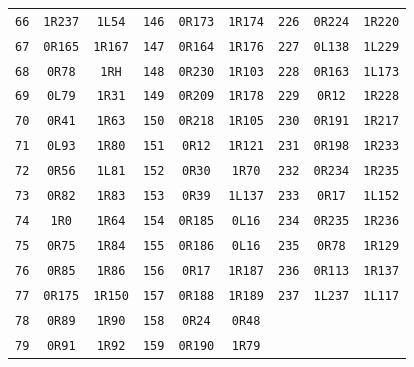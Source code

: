\begin{longtable}{@{}rcc@{\hspace{1.6em}}rcc@{\hspace{1.6em}}rcc@{}}
\texttt{66} & \texttt{1R237} & \texttt{1L54} & \texttt{146} & \texttt{0R173} & \texttt{1R174} & \texttt{226} & \texttt{0R224} & \texttt{1R220}\\
\texttt{67} & \texttt{0R165} & \texttt{1R167} & \texttt{147} & \texttt{0R164} & \texttt{1R176} & \texttt{227} & \texttt{0L138} & \texttt{1L229}\\
\texttt{68} & \texttt{0R78} & \texttt{1RH} & \texttt{148} & \texttt{0R230} & \texttt{1R103} & \texttt{228} & \texttt{0R163} & \texttt{1L173}\\
\texttt{69} & \texttt{0L79} & \texttt{1R31} & \texttt{149} & \texttt{0R209} & \texttt{1R178} & \texttt{229} & \texttt{0R12} & \texttt{1R228}\\
\texttt{70} & \texttt{0R41} & \texttt{1R63} & \texttt{150} & \texttt{0R218} & \texttt{1R105} & \texttt{230} & \texttt{0R191} & \texttt{1R217}\\
\texttt{71} & \texttt{0L93} & \texttt{1R80} & \texttt{151} & \texttt{0R12} & \texttt{1R121} & \texttt{231} & \texttt{0R198} & \texttt{1R233}\\
\texttt{72} & \texttt{0R56} & \texttt{1L81} & \texttt{152} & \texttt{0R30} & \texttt{1R70} & \texttt{232} & \texttt{0R234} & \texttt{1R235}\\
\texttt{73} & \texttt{0R82} & \texttt{1R83} & \texttt{153} & \texttt{0R39} & \texttt{1L137} & \texttt{233} & \texttt{0R17} & \texttt{1L152}\\
\texttt{74} & \texttt{1R0} & \texttt{1R64} & \texttt{154} & \texttt{0R185} & \texttt{0L16} & \texttt{234} & \texttt{0R235} & \texttt{1R236}\\
\texttt{75} & \texttt{0R75} & \texttt{1R84} & \texttt{155} & \texttt{0R186} & \texttt{0L16} & \texttt{235} & \texttt{0R78} & \texttt{1R129}\\
\texttt{76} & \texttt{0R85} & \texttt{1R86} & \texttt{156} & \texttt{0R17} & \texttt{1R187} & \texttt{236} & \texttt{0R113} & \texttt{1R137}\\
\texttt{77} & \texttt{0R175} & \texttt{1R150} & \texttt{157} & \texttt{0R188} & \texttt{1R189} & \texttt{237} & \texttt{1L237} & \texttt{1L117}\\
\texttt{78} & \texttt{0R89} & \texttt{1R90} & \texttt{158} & \texttt{0R24} & \texttt{0R48} & {} & {} & {}\\
\texttt{79} & \texttt{0R91} & \texttt{1R92} & \texttt{159} & \texttt{0R190} & \texttt{1R79} & {} & {} & {}\\
\end{longtable}
\endgroup
